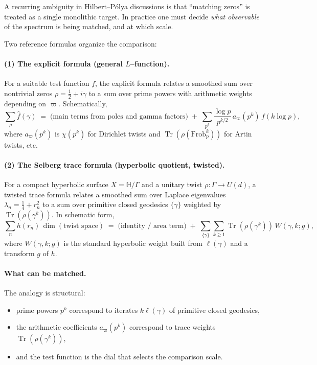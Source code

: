 \documentclass[11pt,oneside]{amsbook}
\numberwithin{equation}{section}
\theoremstyle{plain}
\theoremstyle{definition}
\theoremstyle{remark}
\newcommand{\HH}{\mathbb{H}}
\DeclareMathOperator{\Tr}{\mathrm{Tr}}
\begin{document}
A recurring ambiguity in Hilbert--Pólya discussions is that ``matching zeros'' is treated as a single monolithic target.
In practice one must decide \emph{what observable} of the spectrum is being matched, and at which scale.

Two reference formulas organize the comparison:

\paragraph{(1) The explicit formula (general $L$--function).}
For a suitable test function $f$, the explicit formula relates a smoothed sum over nontrivial zeros $\rho=\tfrac12+i\gamma$ to a sum over prime powers with arithmetic weights depending on $\varpi$.
Schematically,
\[
\sum_{\rho} \widehat{f}(\gamma)
\;=\;
\text{(main terms from poles and gamma factors)}\;+\;\sum_{p^k}\frac{\log p}{p^{k/2}}\, a_\varpi(p^k)\, f(k\log p),
\]
where $a_\varpi(p^k)$ is $\chi(p^k)$ for Dirichlet twists and $\Tr(\rho(\mathrm{Frob}_p^k))$ for Artin twists, etc.

\paragraph{(2) The Selberg trace formula (hyperbolic quotient, twisted).}
For a compact hyperbolic surface $X=\HH/\Gamma$ and a unitary twist $\rho:\Gamma\to U(d)$, a twisted trace formula relates a smoothed sum over Laplace eigenvalues $\lambda_n=\tfrac14+r_n^2$ to a sum over primitive closed geodesics $\{\gamma\}$ weighted by $\Tr(\rho(\gamma^k))$.
In schematic form,
\[
\sum_{n} h(r_n)\,\dim(\text{twist space})
\;=\;
\text{(identity / area term)}\;+\;
\sum_{\{\gamma\}}\sum_{k\ge 1} \Tr(\rho(\gamma^k))\,W(\gamma,k;g),
\]
where $W(\gamma,k;g)$ is the standard hyperbolic weight built from $\ell(\gamma)$ and a transform $g$ of $h$.

\paragraph{What can be matched.}
The analogy is structural:
\begin{itemize}
\item prime powers $p^k$ correspond to iterates $k\ell(\gamma)$ of primitive closed geodesics,
\item the arithmetic coefficients $a_\varpi(p^k)$ correspond to trace weights $\Tr(\rho(\gamma^k))$,
\item and the test function is the dial that selects the comparison scale.
\end{itemize}
\end{document}
